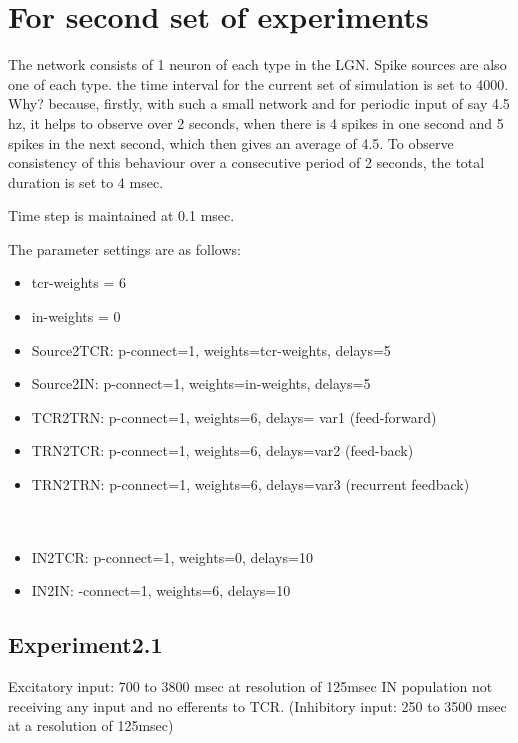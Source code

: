 \documentclass[11pt,a4paper]{article}
\begin{document}
\section{For second set of experiments}
\label{sec:2}
The network consists of 1 neuron of each type in the LGN. Spike sources are also one of each type. the time interval for the current set of simulation is set to 4000. Why? because, firstly, with such a small network and for periodic input of say 4.5 hz, it helps to observe over 2 seconds, when there is 4 spikes in one second and 5 spikes in the next second, which then gives an average of 4.5. To observe consistency of this behaviour over a consecutive period of 2 seconds, the total duration is set to 4 msec. 

Time step is maintained at 0.1 msec.

The parameter settings are as follows:
\begin{tcolorbox}
\begin{itemize}
\item tcr-weights = 6
\item in-weights = 0  
  \item Source2TCR: p-connect=1, weights=tcr-weights, delays=5\\
  \item Source2IN: p-connect=1, weights=in-weights, delays=5 \\
   \item TCR2TRN: p-connect=1, weights=6, delays= var1 (feed-forward)\\
 \item  TRN2TCR: p-connect=1, weights=6, delays=var2 (feed-back)\\
 \item  TRN2TRN: p-connect=1, weights=6, delays=var3 (recurrent feedback) \\\\\\
 
 \item  IN2TCR: p-connect=1, weights=0, delays=10 \\
 \item  IN2IN: -connect=1, weights=6, delays=10
\end{itemize}
\end{tcolorbox}

\subsection{Experiment2.1}
\label{sec:21}
Excitatory input: 700 to 3800 msec at resolution of 125msec
IN population not receiving any input and no efferents to TCR.
(Inhibitory input: 250 to 3500 msec at a resolution of 125msec)
\end{document}
